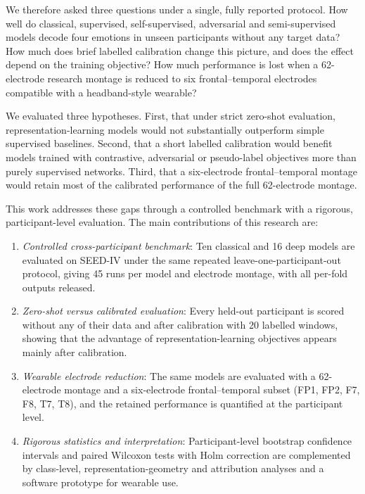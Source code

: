 We therefore asked three questions under a single, fully reported protocol. How well do classical, supervised, self-supervised, adversarial and semi-supervised models decode four emotions in unseen participants without any target data? How much does brief labelled calibration change this picture, and does the effect depend on the training objective? How much performance is lost when a 62-electrode research montage is reduced to six frontal–temporal electrodes compatible with a headband-style wearable?

We evaluated three hypotheses. First, that under strict zero-shot evaluation, representation-learning models would not substantially outperform simple supervised baselines. Second, that a short labelled calibration would benefit models trained with contrastive, adversarial or pseudo-label objectives more than purely supervised networks. Third, that a six-electrode frontal–temporal montage would retain most of the calibrated performance of the full 62-electrode montage.

This work addresses these gaps through a controlled benchmark with a rigorous, participant-level evaluation. The main contributions of this research are:

\begin{enumerate}
  \item \emph{Controlled cross-participant benchmark}: Ten classical and 16 deep models are evaluated on SEED-IV under the same repeated leave-one-participant-out protocol, giving 45 runs per model and electrode montage, with all per-fold outputs released.
  \item \emph{Zero-shot versus calibrated evaluation}: Every held-out participant is scored without any of their data and after calibration with 20 labelled windows, showing that the advantage of representation-learning objectives appears mainly after calibration.
  \item \emph{Wearable electrode reduction}: The same models are evaluated with a 62-electrode montage and a six-electrode frontal–temporal subset (FP1, FP2, F7, F8, T7, T8), and the retained performance is quantified at the participant level.
  \item \emph{Rigorous statistics and interpretation}: Participant-level bootstrap confidence intervals and paired Wilcoxon tests with Holm correction are complemented by class-level, representation-geometry and attribution analyses and a software prototype for wearable use.
\end{enumerate}

